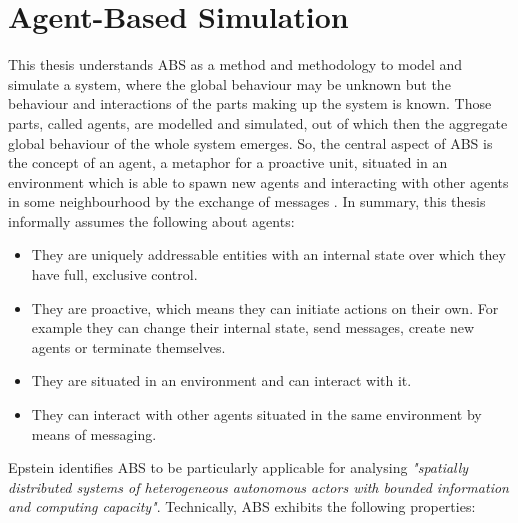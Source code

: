 \section{Agent-Based Simulation}
\label{sec:method_abs}

This thesis understands ABS as a method and methodology to model and simulate a system, where the global behaviour may be unknown but the behaviour and interactions of the parts making up the system is known. Those parts, called agents, are modelled and simulated, out of which then the aggregate global behaviour of the whole system emerges. So, the central aspect of ABS is the concept of an agent, a metaphor for a proactive unit, situated in an environment which is able to spawn new agents and interacting with other agents in some neighbourhood by the exchange of messages \cite{macal_everything_2016, odell_objects_2002, siebers_introduction_2008, wooldridge_introduction_2009}. In summary, this thesis informally assumes the following about agents:

\begin{itemize}
	\item They are uniquely addressable entities with an internal state over which they have full, exclusive control.
	\item They are proactive, which means they can initiate actions on their own. For example they can change their internal state, send messages, create new agents or terminate themselves.
	\item They are situated in an environment and can interact with it.
	\item They can interact with other agents situated in the same environment by means of messaging.
\end{itemize} 

Epstein \cite{epstein_generative_2012} identifies ABS to be particularly applicable for analysing \textit{"spatially distributed systems of heterogeneous autonomous actors with bounded information and computing capacity"}. Technically, ABS exhibits the following properties:

